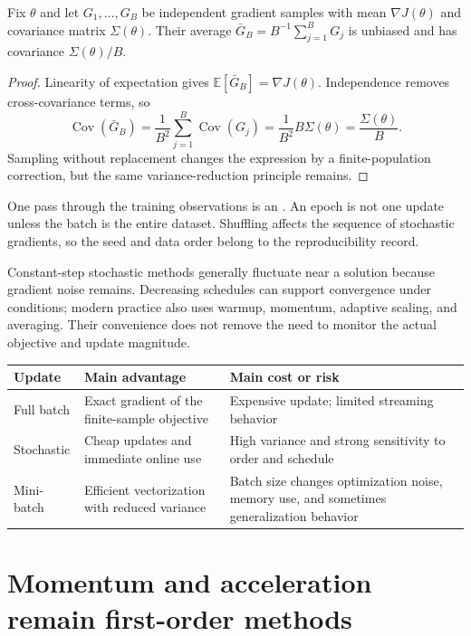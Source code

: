 \begin{proposition}
Fix $\theta$ and let $G_1,\ldots,G_B$ be independent gradient samples with
mean $\nabla J(\theta)$ and covariance matrix $\Sigma(\theta)$. Their average
$\bar G_B=B^{-1}\sum_{j=1}^BG_j$ is unbiased and has covariance
$\Sigma(\theta)/B$.
\end{proposition}

\begin{proof}
Linearity of expectation gives
$\mathbb{E}[\bar G_B]=\nabla J(\theta)$. Independence removes cross-covariance
terms, so
\[
\operatorname{Cov}(\bar G_B)
=\frac{1}{B^2}\sum_{j=1}^B\operatorname{Cov}(G_j)
=\frac{1}{B^2}B\Sigma(\theta)=\frac{\Sigma(\theta)}{B}.
\]
Sampling without replacement changes the expression by a finite-population
correction, but the same variance-reduction principle remains.
\end{proof}

One pass through the training observations is an . An epoch is not
one update unless the batch is the entire dataset. Shuffling affects the
sequence of stochastic gradients, so the seed and data order belong to the
reproducibility record.

Constant-step stochastic methods generally fluctuate near a solution because
gradient noise remains. Decreasing schedules can support convergence under
conditions; modern practice also uses warmup, momentum, adaptive scaling, and
averaging. Their convenience does not remove the need to monitor the actual
objective and update magnitude.

\begin{tabularx}{\textwidth}{@{}p{}p{}X@{}}
\toprule
Update & Main advantage & Main cost or risk \\
\midrule
Full batch & Exact gradient of the finite-sample objective & Expensive update;
limited streaming behavior \\
Stochastic & Cheap updates and immediate online use & High variance and strong
sensitivity to order and schedule \\
Mini-batch & Efficient vectorization with reduced variance & Batch size changes
optimization noise, memory use, and sometimes generalization behavior \\
\bottomrule
\end{tabularx}

\section{Momentum and acceleration remain first-order methods}

